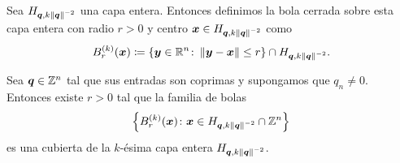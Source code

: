 \begin{definition}
	\label{fin:def:ball}
	Sea $H_{\boldsymbol{q}, k\left\lVert \boldsymbol{q} \right\rVert^{-2}}$ una capa entera. Entonces definimos la bola cerrada sobre
	esta capa entera con radio $r > 0$ y centro $\boldsymbol{x} \in H_{\boldsymbol{q}, k\left\lVert \boldsymbol{q} \right\rVert^{-2}}$ como
	\begin{equation}
		\label{eq:k-ball}
		B_r^{(k)}(\boldsymbol{x}) \coloneq \lbrace \boldsymbol{y} \in \mathbb{R}^n \colon \left\lVert \boldsymbol{y} - \boldsymbol{x} \right\rVert \leq r
		\rbrace \cap H_{\boldsymbol{q}, k \left\lVert \boldsymbol{q} \right\rVert^{-2}}.
	\end{equation}
\end{definition}
\begin{lemma}
	\label{lemma:ball-cover}
	Sea $\boldsymbol{q} \in \mathbb{Z}^n$ tal que sus entradas son coprimas y supongamos que $q_n \neq 0$. Entonces
	existe $r > 0$ tal que la familia de bolas
	\begin{equation*}
		\left\lbrace B_r^{(k)}(\boldsymbol{x}) \colon \boldsymbol{x} \in H_{\boldsymbol{q}, k\left\lVert \boldsymbol{q} \right\rVert^{-2}} \cap
			\mathbb{Z}^n \right\rbrace
	\end{equation*}
	es una cubierta de la $k$-ésima capa entera $H_{\boldsymbol{q}, k\left\lVert \boldsymbol{q} \right\rVert^{-2}}$.
\end{lemma}
